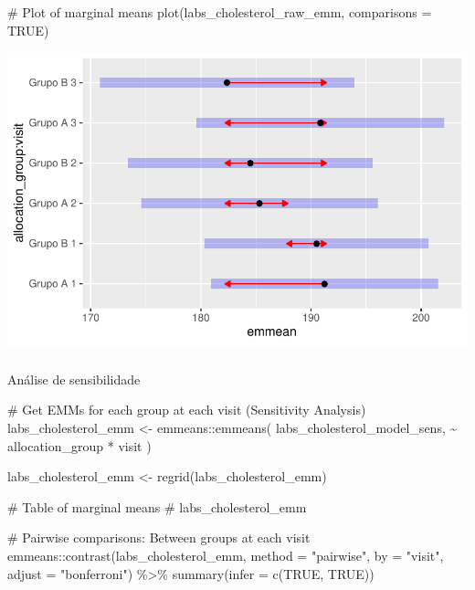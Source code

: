 \documentclass[
  12pt,
]{article}
\makeatletter
\let\oldsubparagraph\subparagraph
\renewcommand{\subparagraph}{
    \@ifstar
      \xxxSubParagraphStar
      \xxxSubParagraphNoStar
  }
\newcommand{\xxxSubParagraphStar}[1]{\oldsubparagraph*{#1}\mbox{}}
\newcommand{\xxxSubParagraphNoStar}[1]{\oldsubparagraph{#1}\mbox{}}
\newenvironment{Shaded}{\begin{snugshade}}{\end{snugshade}}
\newcommand{\AttributeTok}[1]{\textcolor[rgb]{0.40,0.45,0.13}{#1}}
\newcommand{\CommentTok}[1]{\textcolor[rgb]{0.37,0.37,0.37}{#1}}
\newcommand{\ConstantTok}[1]{\textcolor[rgb]{0.56,0.35,0.01}{#1}}
\newcommand{\FunctionTok}[1]{\textcolor[rgb]{0.28,0.35,0.67}{#1}}
\newcommand{\NormalTok}[1]{\textcolor[rgb]{0.00,0.23,0.31}{#1}}
\newcommand{\OtherTok}[1]{\textcolor[rgb]{0.00,0.23,0.31}{#1}}
\newcommand{\SpecialCharTok}[1]{\textcolor[rgb]{0.37,0.37,0.37}{#1}}
\newcommand{\StringTok}[1]{\textcolor[rgb]{0.13,0.47,0.30}{#1}}
\makeatother
\begin{document}
\begin{Shaded}
\begin{Highlighting}[]
\CommentTok{\# Plot of marginal means}
\FunctionTok{plot}\NormalTok{(labs\_cholesterol\_raw\_emm, }\AttributeTok{comparisons =} \ConstantTok{TRUE}\NormalTok{)}
\end{Highlighting}
\end{Shaded}

\includegraphics{Outcomes_files/figure-pdf/labs_cholesterol_raw_emm-1.pdf}

\subparagraph{Análise de
sensibilidade}\label{anuxe1lise-de-sensibilidade-4}

\begin{Shaded}
\begin{Highlighting}[]
\CommentTok{\# Get EMMs for each group at each visit (Sensitivity Analysis)}
\NormalTok{labs\_cholesterol\_emm }\OtherTok{\textless{}{-}}\NormalTok{ emmeans}\SpecialCharTok{::}\FunctionTok{emmeans}\NormalTok{(}
\NormalTok{    labs\_cholesterol\_model\_sens, }
    \SpecialCharTok{\textasciitilde{}}\NormalTok{ allocation\_group }\SpecialCharTok{*}\NormalTok{ visit}
\NormalTok{)}

\NormalTok{labs\_cholesterol\_emm }\OtherTok{\textless{}{-}} \FunctionTok{regrid}\NormalTok{(labs\_cholesterol\_emm)}

\CommentTok{\# Table of marginal means}
\CommentTok{\# labs\_cholesterol\_emm}

\CommentTok{\# Pairwise comparisons: Between groups at each visit}
\NormalTok{emmeans}\SpecialCharTok{::}\FunctionTok{contrast}\NormalTok{(labs\_cholesterol\_emm,}
\AttributeTok{method =} \StringTok{"pairwise"}\NormalTok{, }\AttributeTok{by =} \StringTok{"visit"}\NormalTok{,}
\AttributeTok{adjust =} \StringTok{"bonferroni"}\NormalTok{) }\SpecialCharTok{\%\textgreater{}\%} \FunctionTok{summary}\NormalTok{(}\AttributeTok{infer =} \FunctionTok{c}\NormalTok{(}\ConstantTok{TRUE}\NormalTok{, }\ConstantTok{TRUE}\NormalTok{))}
\end{Highlighting}
\end{Shaded}
\end{document}
